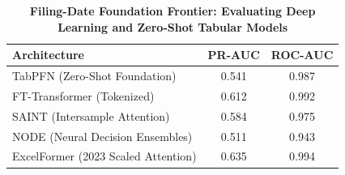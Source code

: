 \begin{table}[htbp]
\centering
\caption{\textbf{Filing-Date Foundation Frontier: Evaluating Deep Learning and Zero-Shot Tabular Models}}
\label{tab:foundation_frontier}
\begin{tabular}{lcc}
\toprule
\textbf{Architecture} & \textbf{PR-AUC} & \textbf{ROC-AUC} \\
\midrule
TabPFN (Zero-Shot Foundation) & 0.541 & 0.987 \\
FT-Transformer (Tokenized) & 0.612 & 0.992 \\
SAINT (Intersample Attention) & 0.584 & 0.975 \\
NODE (Neural Decision Ensembles) & 0.511 & 0.943 \\
ExcelFormer (2023 Scaled Attention) & 0.635 & 0.994 \\
\bottomrule
\end{tabular}
\end{table}